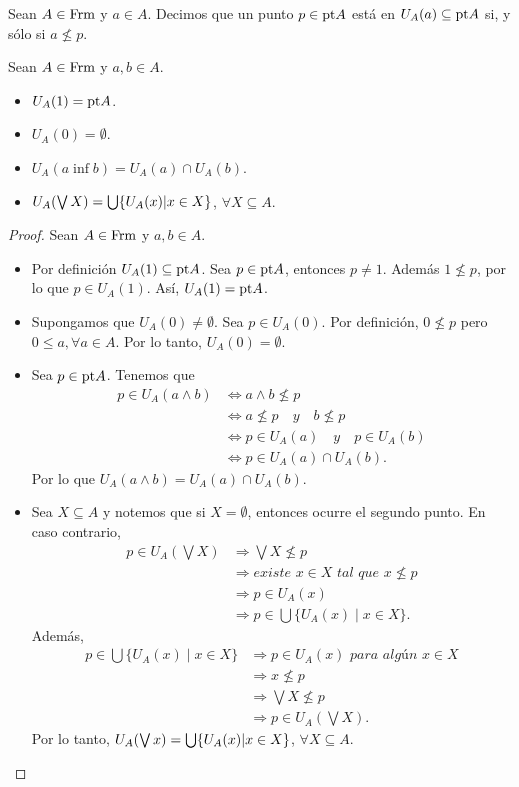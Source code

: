 Sean $A\in \mathrm{Frm}$ y $a\in A$. Decimos que un punto $p\in \mathrm{pt} A$ está en $U_A(a)\subseteq \mathrm{pt} A$ si, y sólo si $a\not\leq p$.
\begin{lemma}
  Sean $A\in \mathrm{Frm}$ y $a,b\in A$.
  \begin{itemize}
      \item $U_A(1)=\mathrm{pt} A$.
      \item $U_A(0)=\emptyset$.
      \item $U_A(a\inf b)=U_A(a)\cap U_A(b)$.
      \item $U_A(\bigvee X)=\bigcup \{U_A(x)|x\in X\}$, $\forall X\subseteq A$.
  \end{itemize}
\end{lemma}
\begin{proof}%
  Sean $A\in \mathrm{Frm}$ y $a,b\in A$.
\begin{itemize}
\item Por definición $U_A(1)\subseteq \mathrm{pt} A$. Sea $p\in \mathrm{pt} A$, entonces $p\neq 1$. Además $1\not\leq p$, por lo que $p\in U_A(1)$. Así, $U_A(1)=\mathrm{pt} A$.
\item Supongamos que $U_A(0)\neq \emptyset$. Sea $p\in U_A(0)$. Por definición, $0\not\leq p$ pero $0\leq a, \forall a\in A$. Por lo tanto, $U_A(0)=\emptyset$.
\item Sea $p\in \mathrm{pt} A$. Tenemos que
\begin{align*}
p\in U_A(a\wedge b)&\iff a\wedge b\not\leq p\\
&\iff a\not\leq p\quad y\quad b\not\leq p\\
&\iff p\in U_A(a)\quad y\quad p\in U_A(b)\\
&\iff p\in U_A(a)\cap U_A(b).
\end{align*}
Por lo que $U_A(a\wedge b)=U_A(a)\cap U_A(b)$.
\item Sea $X\subseteq A$ y notemos que si $X=\emptyset$, entonces ocurre el segundo punto. En caso contrario,
\begin{align*}
p\in U_A(\bigvee X)&\Rightarrow \bigvee X\not\leq p\\
&\Rightarrow \textit{existe }x\in X\textit{ tal que }x\not\leq p\\
&\Rightarrow p\in U_A(x)\\
&\Rightarrow p\in \bigcup \{U_A(x)\mid x\in X\}.
\end{align*}
Además,
\begin{align*}
p\in \bigcup\{U_A(x)\mid x\in X\}&\Rightarrow p\in U_A(x)\textit{ para algún }x\in X\\
&\Rightarrow x\not \leq p\\
&\Rightarrow \bigvee X\not\leq p\\
&\Rightarrow p\in U_A(\bigvee X).
\end{align*}
Por lo tanto, $U_A(\bigvee x)=\bigcup \{U_A(x)|x\in X\}$, $\forall X\subseteq A$.
\end{itemize}
\end{proof}
